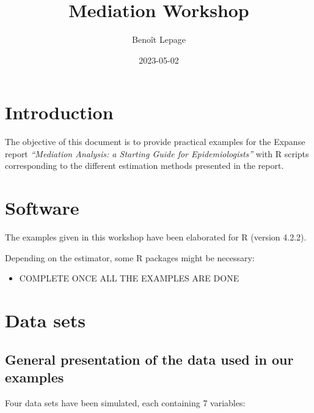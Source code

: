\documentclass[
]{book}
\title{Mediation Workshop}
\author{Benoît Lepage}
\date{2023-05-02}
\providecommand{\tightlist}{%
  \setlength{\itemsep}{0pt}\setlength{\parskip}{0pt}}
\begin{document}
\maketitle

{
\setcounter{tocdepth}{1}
\tableofcontents
}
\hypertarget{introduction}{%
\chapter{Introduction}\label{introduction}}

The objective of this document is to provide practical examples for the Expanse report \emph{``Mediation Analysis: a Starting Guide for Epidemiologists''} with R scripts corresponding to the different estimation methods presented in the report.

\hypertarget{software}{%
\chapter{Software}\label{software}}

The examples given in this workshop have been elaborated for R (version 4.2.2).

Depending on the estimator, some R packages might be necessary:

\begin{itemize}
\tightlist
\item
  COMPLETE ONCE ALL THE EXAMPLES ARE DONE
\end{itemize}

\hypertarget{data-sets}{%
\chapter{Data sets}\label{data-sets}}

\hypertarget{general-presentation-of-the-data-used-in-our-examples}{%
\section{General presentation of the data used in our examples}\label{general-presentation-of-the-data-used-in-our-examples}}

Four data sets have been simulated, each containing 7 variables:
\end{document}
